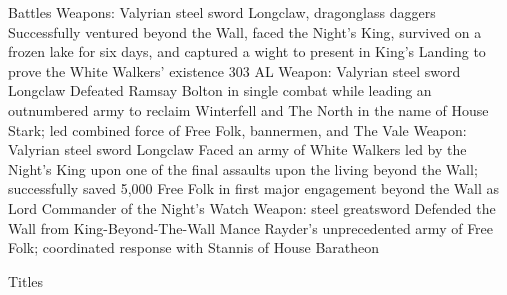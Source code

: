 \documentclass[]{resume-rajatscode}
\begin{document}
\begin{topic}{Battles}
    {Weapons: Valyrian steel sword Longclaw, dragonglass daggers}
    {Successfully ventured beyond the Wall, faced the Night's King,
    survived on a frozen lake for six days, and captured a wight to present
    in King's Landing to prove the White Walkers' existence}
    {303 AL}
    {Weapon: Valyrian steel sword Longclaw}
    {Defeated Ramsay Bolton in single combat while leading an outnumbered
    army to reclaim Winterfell and The North in the name of House Stark;
    led combined force of Free Folk, bannermen, and The Vale}
    {Weapon: Valyrian steel sword Longclaw}
    {Faced an army of White Walkers led by the Night's King upon one of the
    final assaults upon the living beyond the Wall; successfully saved 5,000
    Free Folk in first major engagement beyond the Wall as Lord Commander of
    the Night's Watch}
    {Weapon: steel greatsword}
    {Defended the Wall from King-Beyond-The-Wall Mance Rayder's unprecedented
    army of Free Folk; coordinated response with Stannis of House Baratheon}
\end{topic}

\begin{topic}{Titles}
    \\
    \\
\end{topic}
\end{document}
